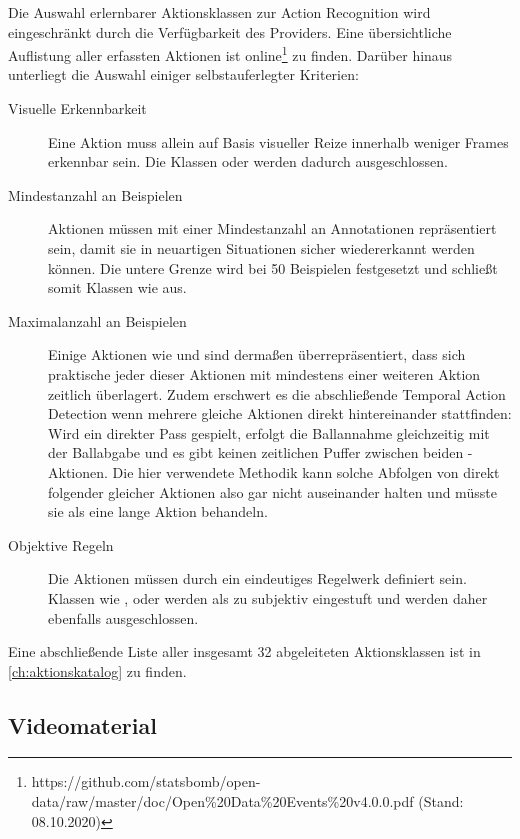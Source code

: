 Die Auswahl erlernbarer Aktionsklassen zur Action Recognition wird eingeschränkt durch die Verfügbarkeit des Providers.
Eine übersichtliche Auflistung aller erfassten Aktionen ist online\footnote{https://github.com/statsbomb/open-data/raw/master/doc/Open\%20Data\%20Events\%20v4.0.0.pdf (Stand: 08.10.2020)} zu finden.
Darüber hinaus unterliegt die Auswahl einiger selbstauferlegter Kriterien:

\begin{description}
    \item[Visuelle Erkennbarkeit] Eine Aktion muss allein auf Basis visueller Reize innerhalb weniger Frames erkennbar sein.
    Die Klassen  oder  werden dadurch ausgeschlossen.
    \item[Mindestanzahl an Beispielen] Aktionen müssen mit einer Mindestanzahl an Annotationen repräsentiert sein, damit sie in neuartigen Situationen sicher wiedererkannt werden können.
    Die untere Grenze wird bei 50 Beispielen festgesetzt und schließt somit Klassen wie  aus.
    \item[Maximalanzahl an Beispielen] Einige Aktionen wie  und  sind dermaßen überrepräsentiert, dass sich praktische jeder dieser Aktionen mit mindestens einer weiteren Aktion zeitlich überlagert.
    Zudem erschwert es die abschließende Temporal Action Detection wenn mehrere gleiche Aktionen direkt hintereinander stattfinden:
    Wird \zB ein direkter Pass gespielt, erfolgt die Ballannahme gleichzeitig mit der Ballabgabe und es gibt keinen zeitlichen Puffer zwischen beiden -Aktionen.
    Die hier verwendete Methodik kann solche Abfolgen von direkt folgender gleicher Aktionen also gar nicht auseinander halten und müsste sie als eine lange Aktion behandeln.
    \item[Objektive Regeln] Die Aktionen müssen durch ein eindeutiges Regelwerk definiert sein.
    Klassen wie ,  oder  werden als zu subjektiv eingestuft und werden daher ebenfalls ausgeschlossen.
\end{description}

Eine abschließende Liste aller insgesamt 32 abgeleiteten Aktionsklassen ist in \autoref{ch:aktionskatalog} zu finden.

\subsection{Videomaterial}
\label{subsec:videomaterial}

